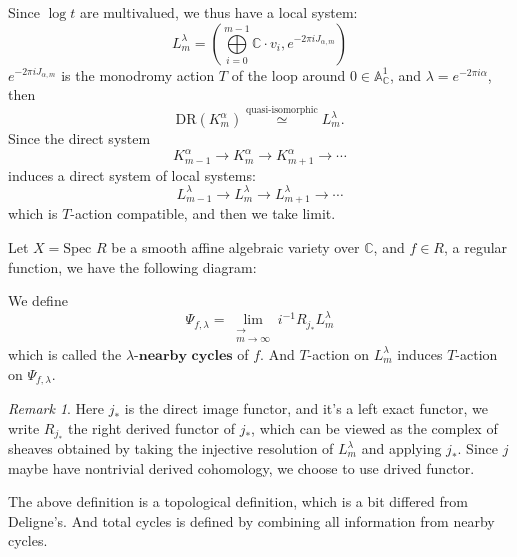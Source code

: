 \documentclass[openany]{book}
\theoremstyle{definition} %
\theoremstyle{remark}
\newtheorem{remark}{Remark}[chapter] %
\begin{document}
Since $\log t$ are multivalued, we thus have a local system: $$L_m^{\lambda}=(\bigoplus \limits_{i=0}^{m-1}\mathbb{C}\cdot v_{i}, e^{-2\pi iJ_{\alpha,m}})$$$e^{-2\pi i J_{\alpha,m}}$ is the monodromy action $T$ of the loop around $0 \in \mathbb{A}_{\mathbb{C}}^1$, and $\lambda = e^{-2\pi i \alpha}$, then
$$ \text{DR}(K_m^{\alpha}) \stackrel{\text{quasi-isomorphic}}{\simeq} L_m^{\lambda}. $$
Since the direct system $$ K_{m-1}^{\alpha} \rightarrow K_m^{\alpha} \rightarrow K_{m+1}^{\alpha} \rightarrow \cdots $$induces a direct system of local systems: $$ L_{m-1}^{\lambda} \rightarrow L_m^{\lambda} \rightarrow L_{m+1}^{\lambda} \rightarrow \cdots $$which is $T$-action compatible, and then we take limit.

Let $X = \text{Spec } R$ be a smooth affine algebraic variety over $\mathbb{C}$, and $f \in R$, a regular function, we have the following diagram:
\begin{center}
\end{center}


We define $$ \Psi_{f,\lambda} = \lim_{\substack{\longrightarrow \\ m \to \infty}} i^{-1} R_{j_*} L_m^{\lambda} $$which is called the $\lambda\textbf{-nearby cycles}$ of $f$. And $T$-action on $L_m^{\lambda}$ induces $T$-action on $\Psi_{f,\lambda}$.

\begin{remark}
    Here $j_{\ast}$ is the direct image functor, and it's a left exact functor, we write $R_{j_{\ast}}$ the right derived functor of $j_{\ast}$, which can be viewed as the complex of sheaves obtained by taking the injective resolution of $L_{m}^{\lambda}$ and applying $j_{\ast}$. Since $j$ maybe have nontrivial derived cohomology, we choose to use drived functor.

    The above definition is a topological definition, which is a bit differed from Deligne's. And total cycles is defined by combining all information from nearby cycles.
\end{remark}
\end{document}
